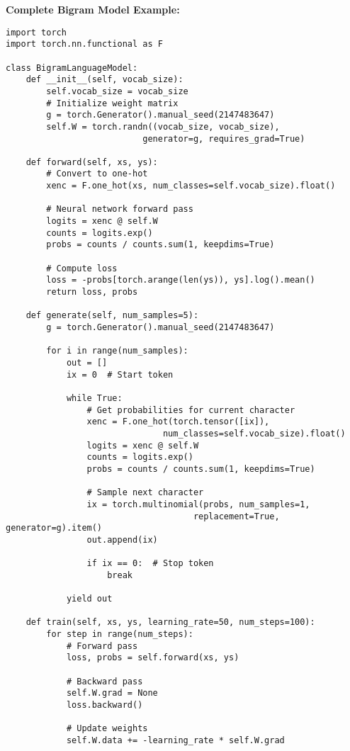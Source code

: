 \documentclass[11pt,a4paper]{book}
\begin{document}
\textbf{Complete Bigram Model Example:}
\begin{verbatim}
import torch
import torch.nn.functional as F

class BigramLanguageModel:
    def __init__(self, vocab_size):
        self.vocab_size = vocab_size
        # Initialize weight matrix
        g = torch.Generator().manual_seed(2147483647)
        self.W = torch.randn((vocab_size, vocab_size), 
                           generator=g, requires_grad=True)
    
    def forward(self, xs, ys):
        # Convert to one-hot
        xenc = F.one_hot(xs, num_classes=self.vocab_size).float()
        
        # Neural network forward pass
        logits = xenc @ self.W
        counts = logits.exp()
        probs = counts / counts.sum(1, keepdims=True)
        
        # Compute loss
        loss = -probs[torch.arange(len(ys)), ys].log().mean()
        return loss, probs
    
    def generate(self, num_samples=5):
        g = torch.Generator().manual_seed(2147483647)
        
        for i in range(num_samples):
            out = []
            ix = 0  # Start token
            
            while True:
                # Get probabilities for current character
                xenc = F.one_hot(torch.tensor([ix]), 
                               num_classes=self.vocab_size).float()
                logits = xenc @ self.W
                counts = logits.exp()
                probs = counts / counts.sum(1, keepdims=True)
                
                # Sample next character
                ix = torch.multinomial(probs, num_samples=1, 
                                     replacement=True, generator=g).item()
                out.append(ix)
                
                if ix == 0:  # Stop token
                    break
            
            yield out
    
    def train(self, xs, ys, learning_rate=50, num_steps=100):
        for step in range(num_steps):
            # Forward pass
            loss, probs = self.forward(xs, ys)
            
            # Backward pass
            self.W.grad = None
            loss.backward()
            
            # Update weights
            self.W.data += -learning_rate * self.W.grad
            

\end{verbatim}
\end{document}
